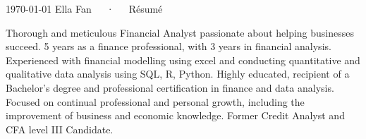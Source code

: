 \documentclass[11pt, a4paper]{awesome-cv}
\begin{document}
\makecvheader[C]

\makecvfooter
  {\today}
  {Ella Fan~~~·~~~Résumé}
  {\thepage}


% 
% 
% 
% 
% 



\begin{cvparagraph}

Thorough and meticulous Financial Analyst passionate about helping businesses succeed.
5 years as a finance professional, with 3 years in financial analysis.
Experienced with financial modelling using excel and conducting quantitative and qualitative data analysis using SQL, R, Python.
Highly educated, recipient of a Bachelor's degree and professional certification in finance and data analysis. 
Focused on continual professional and personal growth, including the improvement of business and economic knowledge.
Former Credit Analyst and CFA level III Candidate.
\end{cvparagraph}


\end{document}
